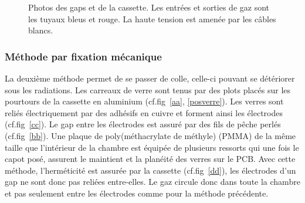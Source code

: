 \begin{figure}[ht!]
\begin{minipage}[t]{.45\textwidth}
    \end{minipage}
 	\caption{Photos des gaps et de la cassette. Les entrées et sorties de gaz sont les tuyaux bleus et rouge. La haute tension est amenée par les câbles blancs.}
 	\label{colle}
 \end{figure}
 
 \subsubsection{Méthode par fixation mécanique}
 La deuxième méthode permet de se passer de colle, celle-ci pouvant se détériorer sous les radiations. Les carreaux de verre sont tenus par des plots placés sur les pourtours de la cassette en aluminium (cf.fig~\ref{aa}, \ref{posverre}). Les verres sont reliés électriquement par des adhésifs en cuivre et forment ainsi les électrodes (cf.fig~\ref{cc}). Le gap entre les électrodes est assuré par des fils de pêche perlés (cf.fig~\ref{bb}). Une plaque de poly(méthacrylate de méthyle) (PMMA) de la même taille que l'intérieur de la chambre est équipée de plusieurs ressorts qui une fois le capot posé, assurent le maintient et la planéité des verres sur le PCB.  Avec cette méthode, l'herméticité est assurée par la cassette (cf.fig~\ref{dd}), les électrodes d'un gap ne sont donc pas reliées entre-elles. Le gaz circule donc dans toute la chambre et pas seulement entre les électrodes comme pour la méthode précédente.
 
